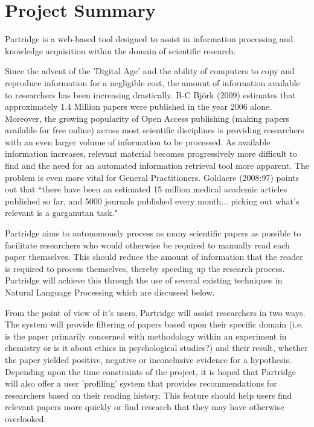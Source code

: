 \documentclass[12pt,a4paper]{article}
\begin{document}




\setlength{\parindent}{0pt}
\setlength{\parskip}{1.5ex plus 0.5ex minus 0.2ex}

\tableofcontents

\pagebreak

\section{Project Summary}

Partridge is a web-based tool designed to assist in information processing and knowledge
acquisition within the domain of scientific research.

Since the advent of the 'Digital Age' and the ability of computers to copy and
reproduce information for a negligible cost, the amount of information
available to researchers has been increasing drastically.  B-C Bj\"{o}rk (2009)
estimates that approximately 1.4 Million papers were published in the year 2006
alone\cite{bjork2009}. Moreover, the growing popularity of Open Access
publishing (making papers available for free online\cite{Suber2012}) across
most scientific disciplines\cite{bjork2009}\cite{harnad2004comparing} is
providing researchers with an even larger volume of information to be
processed. As available information increases, relevant material becomes
progressively more difficult to find and the need for an automated information
retrieval tool more apparent. The problem is even more vital for General
Practitioners. Goldacre (2008:97) points out that ``there have been an
estimated 15 million medical academic articles published so far, and 5000
journals published every month... picking out what's relevant is a garganutan
task."\cite{goldacre2008bad} 

Partridge aims to autonomously process as many scientific papers as possible to
facilitate researchers who would otherwise be required to manually read each
paper themselves. This should reduce the amount of information that the reader
is required to process themselves, thereby speeding up the research process.
Partridge will achieve this through the use of several existing techniques in
Natural Language Processing which are discussed below.

From the point of view of it's users, Partridge will assist researchers in two
ways. The system will provide filtering of papers based upon their
specific domain (i.e. is the paper primarily concerned with methodology within
an experiment in chemistry or is it about ethics in psychological studies?) and
their result, whether the paper yielded positive, negative or inconclusive
evidence for a hypothesis. Depending upon the time constraints of the
project, it is hoped that Partridge will also offer a user 'profiling' system
that provides recommendations for researchers based on their reading history.
This feature should help users find relevant papers more quickly or find
research that they may have otherwise overlooked.
\end{document}
